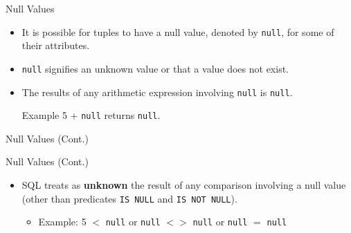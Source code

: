 \documentclass{beamer}
\begin{document}
\begin{frame}[fragile]{Null Values}
    \begin{itemize}
        \item It is possible for tuples to have a null value, denoted by \texttt{null}, for some of their attributes.
        \item \texttt{null} signifies an unknown value or that a value does not exist.
        \item The results of any arithmetic expression involving \texttt{null} is \texttt{null}.
        \begin{exampleblock}{Example}
            5 + \texttt{null} returns \texttt{null}.
        \end{exampleblock}
    \end{itemize}
\end{frame}

\begin{frame}[fragile]{Null Values (Cont.)}
\end{frame}

\begin{frame}[fragile]{Null Values (Cont.)}
    \begin{itemize}
        \item SQL treats as \textbf{unknown} the result of any comparison involving a null value (other than predicates \texttt{IS NULL} and \texttt{IS NOT NULL}).
        \begin{itemize}
            \item Example: 5 $<$ \texttt{null} or \texttt{null} $<>$ \texttt{null} or \texttt{null} $=$ \texttt{null}
        \end{itemize}
    \end{itemize}
\end{frame}
\end{document}
